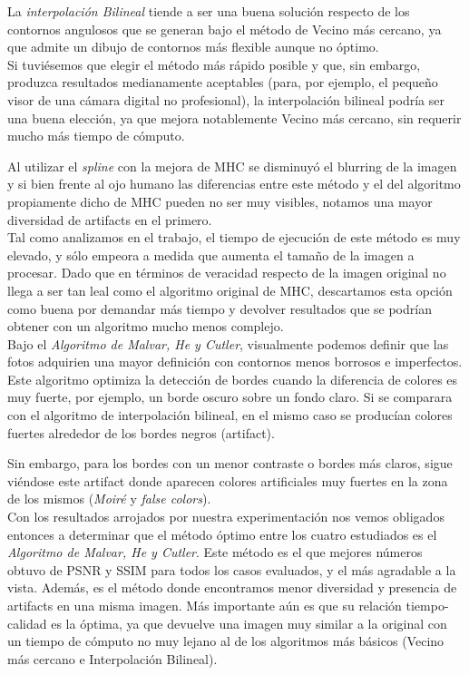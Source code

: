 \documentclass[a4paper]{article}
\begin{document}
La \textit{interpolaci\'on Bilineal} tiende a ser una buena soluci\'on respecto de los contornos angulosos que se generan bajo el m\'etodo de Vecino m\'as cercano, ya que admite un dibujo de contornos m\'as flexible aunque no \'optimo.\\
Si tuviésemos que elegir el método más rápido posible y que, sin embargo, produzca resultados medianamente aceptables (para, por ejemplo, el pequeño visor de una cámara digital no profesional), la interpolación bilineal podría ser una buena elección, ya que mejora notablemente Vecino más cercano, sin requerir mucho más tiempo de cómputo.

Al utilizar el \textit{spline} con la mejora de MHC se disminuy\'o el blurring de la imagen y si bien frente al ojo humano las diferencias entre este m\'etodo y el del algoritmo propiamente dicho de MHC pueden no ser muy visibles, notamos una mayor diversidad de artifacts en el primero. \\
Tal como analizamos en el trabajo, el tiempo de ejecuci\'on de este m\'etodo es muy elevado, y sólo empeora a medida que aumenta el tama\~no de la imagen a procesar. Dado que en t\'erminos de veracidad respecto de la imagen original no llega a ser tan leal como el algoritmo original de MHC, descartamos esta opci\'on como buena por demandar m\'as tiempo y devolver resultados que se podrían obtener con un algoritmo mucho menos complejo.\\

Bajo el \textit{Algoritmo de Malvar, He y Cutler}, visualmente podemos definir que las fotos adquirien una mayor definici\'on con contornos menos borrosos e imperfectos. Este algoritmo optimiza la detecci\'on de bordes cuando la diferencia de colores es muy fuerte, por ejemplo, un borde oscuro sobre un fondo claro. Si se comparara con el algoritmo de interpolaci\'on bilineal, en el mismo caso se produc\'ian colores fuertes alrededor de los bordes negros (artifact).

Sin embargo, para los bordes con un menor contraste o bordes m\'as claros, sigue vi\'endose este artifact donde aparecen colores artificiales muy fuertes en la zona de los mismos (\textit{Moiré} y \textit{false colors}).\\

Con los resultados arrojados por nuestra experimentaci\'on nos vemos obligados entonces a determinar que el m\'etodo \'optimo entre los cuatro estudiados es el \textit{Algoritmo de Malvar, He y Cutler}. Este m\'etodo es el que mejores n\'umeros obtuvo de PSNR y SSIM para todos los casos evaluados, y el más agradable a la vista. Adem\'as, es el m\'etodo donde encontramos menor diversidad y presencia de artifacts en una misma imagen. M\'as importante a\'un es que su relaci\'on tiempo-calidad es la \'optima, ya que devuelve una imagen muy similar a la original con un tiempo de c\'omputo no muy lejano al de los algoritmos m\'as b\'asicos (Vecino m\'as cercano e Interpolación Bilineal). \\
\end{document}
